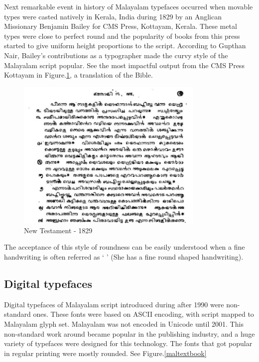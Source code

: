 \documentclass[10pt]{article}
\begin{document}
Next remarkable event in history of Malayalam typefaces occurred when movable types were casted natively in Kerala, India during 1829 by an Anglican Missionary Benjamin Bailey\cite{babucherian} for CMS Press, Kottayam, Kerala. These metal types were close to perfect round and the popularity of books from this press started to give uniform height proportions to the script. According to Gupthan Nair, Bailey's contributions as a typographer made the curvy style of the Malayalam script popular\cite{gupthannair}. See the most impactful output from the CMS Press Kottayam in Figure.\ref{newtestament}, a translation of the Bible.


\begin{figure}
	\centering
	\includegraphics[width=0.8\textwidth]{images/newtestament1829.png}
	\caption{New Testament - 1829}
	\label{newtestament}
\end{figure}

The acceptance of this style of roundness can be easily understood when a fine handwriting is often referred as `{ }' (She has a fine round shaped handwriting).


\subsection{Digital typefaces}

Digital typefaces of Malayalam script introduced during after 1990 were non-standard ones. These fonts were based on ASCII encoding, with script mapped to Malayalam glyph set. Malayalam was not encoded in Unicode until 2001. This non-standard work around became popular in the publishing industry, and a huge variety of typefaces were designed for this technology. The fonts that got popular in regular printing were mostly rounded. See Figure.\ref{maltextbook}
\end{document}
